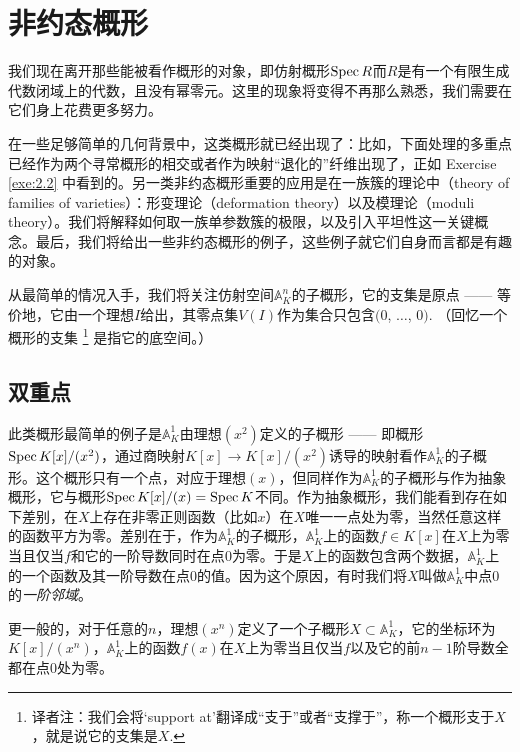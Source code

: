 \section{非约态概形}

我们现在离开那些能被看作概形的对象，即仿射概形$\operatorname{Spec} R$而$R$是有一个有限生成代数闭域上的代数，且没有幂零元。这里的现象将变得不再那么熟悉，我们需要在它们身上花费更多努力。

在一些足够简单的几何背景中，这类概形就已经出现了：比如，下面处理的多重点已经作为两个寻常概形的相交或者作为映射“退化的”纤维出现了，正如 Exercise \ref{exe:2.2} 中看到的。另一类非约态概形重要的应用是在一族簇的理论中（theory of families of varieties）：形变理论（deformation theory）以及模理论（moduli theory）。我们将解释如何取一族单参数簇的极限，以及引入平坦性这一关键概念。最后，我们将给出一些非约态概形的例子，这些例子就它们自身而言都是有趣的对象。

从最简单的情况入手，我们将关注仿射空间$\mathbb{A}_K^n$的子概形，它的支集是原点 ------ 等价地，它由一个理想$I$给出，其零点集$V(I)$作为集合只包含$(0$, $\dots$, $0)$. （回忆一个概形的支集%
\footnote{译者注：我们会将`support at'翻译成“支于”或者“支撑于”，称一个概形支于$X$，就是说它的支集是$X$.}%
是指它的底空间。）

\subsection{双重点}\label{s:2.3.1}
\begin{exa}
	此类概形最简单的例子是$\mathbb{A}_K^1$由理想$(x^2)$定义的子概形 ------ 即概形$\operatorname{Spec} K[x]/(x^2)$，通过商映射$K[x]\to K[x]/(x^2)$诱导的映射看作$\mathbb{A}_K^1$的子概形。这个概形只有一个点，对应于理想$(x)$，但同样作为$\mathbb{A}_K^1$的子概形与作为抽象概形，它与概形$\operatorname{Spec} K[x]/(x)=\operatorname{Spec} K$不同。作为抽象概形，我们能看到存在如下差别，在$X$上存在非零正则函数（比如$x$）在$X$唯一一点处为零，当然任意这样的函数平方为零。差别在于，作为$\mathbb{A}_K^1$的子概形，$\mathbb{A}_K^1$上的函数$f\in K[x]$在$X$上为零当且仅当$f$和它的一阶导数同时在点$0$为零。于是$X$上的函数包含两个数据，$\mathbb{A}_K^1$上的一个函数及其一阶导数在点$0$的值。因为这个原因，有时我们将$X$叫做$\mathbb{A}_K^1$中点$0$的\textit{一阶邻域}。
\end{exa}

更一般的，对于任意的$n$，理想$(x^n)$定义了一个子概形$X\subset \mathbb{A}_K^1$，它的坐标环为$K[x]/(x^n)$，$\mathbb{A}_K^1$上的函数$f(x)$在$X$上为零当且仅当$f$以及它的前$n-1$阶导数全都在点$0$处为零。

